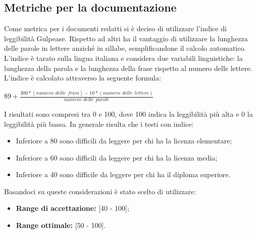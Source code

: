 \subsection{Metriche per la documentazione}
\label{sezione 3.8}
Come metrica per i documenti redatti si è deciso di utilizzare l'indice di leggibilità Gulpease. Rispetto ad altri ha il vantaggio di utilizzare la lunghezza delle parole in lettere anziché in sillabe, semplificandone il calcolo automatico. L'indice è tarato sulla lingua italiana e considera due variabili linguistiche: la lunghezza della parola e la lunghezza della frase rispetto al numero delle lettere. \\
\noindent L'indice è calcolato attraverso la seguente formula:\\
\begin{center}
	$89+ \frac{300*\left(numero\:\ delle\:\ frasi \right)-10*\left(numero\:\ delle\:\ lettere\right)}{numero\:\ delle\:\ parole}$
\end{center}
I risultati sono compresi tra 0 e 100, dove 100 indica la leggibilità più alta e 0 la leggibilità più bassa. In generale risulta che i testi con indice:
\begin{itemize}
	\item Inferiore a 80 sono difficili da leggere per chi ha la licenza elementare;
	\item Inferiore a 60 sono difficili da leggere per chi ha la licenza media;
	\item Inferiore a 40 sono difficile da leggere per chi ha il diploma superiore.
\end{itemize}
Basandoci su queste considerazioni è stato scelto di utilizzare:
\begin{itemize}
	\item \textbf{Range di accettazione:} [40 - 100];
	\item \textbf{Range ottimale:} [50 - 100].
\end{itemize}
	
